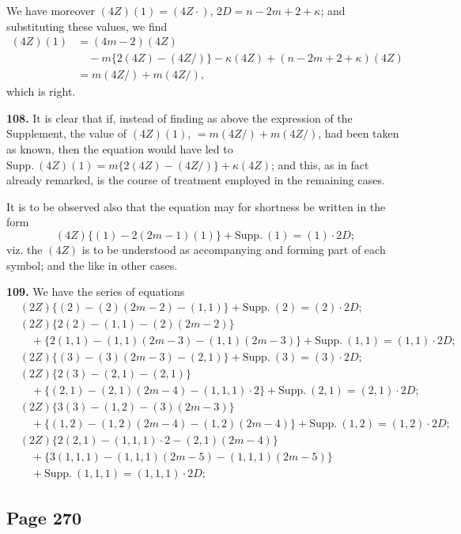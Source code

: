 \documentclass[11pt,a4paper]{article}
\theoremstyle{definition}
\begin{document}
We have moreover $(4Z)(1) = (4Z \cdot)$, $2D = n - 2m + 2 + \kappa$; and substituting these values, we find
\begin{align*}
(4Z)(1) &= (4m - 2)(4Z)\\
&\quad - m\{2(4Z) - (4Z/)\} - \kappa(4Z) + (n - 2m + 2 + \kappa)(4Z)\\
&= m(4Z/) + m(4Z/),
\end{align*}
which is right.

\medskip
\noindent\textbf{108.} It is clear that if, instead of finding as above the expression of the Supplement, the value of $(4Z)(1)$, $= m(4Z/) + m(4Z/)$, had been taken as known, then the equation would have led to $\text{Supp.}\ (4Z)(1) = m\{2(4Z) - (4Z/)\} + \kappa(4Z)$; and this, as in fact already remarked, is the course of treatment employed in the remaining cases.

It is to be observed also that the equation may for shortness be written in the form
\[
(4Z)\{(1) - 2(2m - 1)(1)\} + \text{Supp.}\ (1) = (1) \cdot 2D;
\]
viz. the $(4Z)$ is to be understood as accompanying and forming part of each symbol; and the like in other cases.

\medskip
\noindent\textbf{109.} We have the series of equations
\begin{align*}
&(2Z)\{(2) - (2)(2m-2) - (1,1)\} + \text{Supp.}\ (2) = (2) \cdot 2D;\\
&(2Z)\{2(2) - (1,1) - (2)(2m-2)\}\\
&\quad + \{2(1,1) - (1,1)(2m-3) - (1,1)(2m-3)\} + \text{Supp.}\ (1,1) = (1,1) \cdot 2D;\\
&(2Z)\{(3) - (3)(2m-3) - (2,1)\} + \text{Supp.}\ (3) = (3) \cdot 2D;\\
&(2Z)\{2(3) - (2,1) - (2,1)\}\\
&\quad + \{(2,1) - (2,1)(2m-4) - (1,1,1) \cdot 2\} + \text{Supp.}\ (2,1) = (2,1) \cdot 2D;\\
&(2Z)\{3(3) - (1,2) - (3)(2m-3)\}\\
&\quad + \{(1,2) - (1,2)(2m-4) - (1,2)(2m-4)\} + \text{Supp.}\ (1,2) = (1,2) \cdot 2D;\\
&(2Z)\{2(2,1) - (1,1,1) \cdot 2 - (2,1)(2m-4)\}\\
&\quad + \{3(1,1,1) - (1,1,1)(2m-5) - (1,1,1)(2m-5)\}\\
&\quad + \text{Supp.}\ (1,1,1) = (1,1,1) \cdot 2D;
\end{align*}

\subsection*{Page 270}
\end{document}
